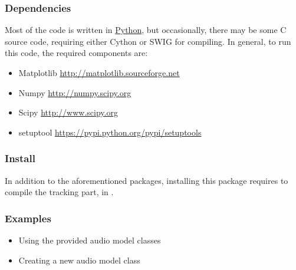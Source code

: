 \documentclass[letterpaper,10pt,english]{sphinxmanual}
\begin{document}
\subsubsection{Dependencies}
\label{description:dependencies}
Most of the code is written in \href{http://www.python.org}{Python}, but occasionally, there may be some C source code, requiring either Cython or SWIG for compiling. In general, to run this code, the required components are:
\begin{itemize}
\item {} 
Matplotlib \href{http://matplotlib.sourceforge.net}{http://matplotlib.sourceforge.net}

\item {} 
Numpy \href{http://numpy.scipy.org}{http://numpy.scipy.org}

\item {} 
Scipy \href{http://www.scipy.org}{http://www.scipy.org}

\item {} 
setuptool \href{https://pypi.python.org/pypi/setuptools}{https://pypi.python.org/pypi/setuptools}

\end{itemize}


\subsubsection{Install}
\label{description:install}
In addition to the aforementioned packages, installing this package requires to compile the tracking part, in .


\subsubsection{Examples}
\label{description:examples}\begin{itemize}
\item {} 
Using the provided audio model classes

\item {} 
Creating a new audio model class

\end{itemize}
\end{document}
